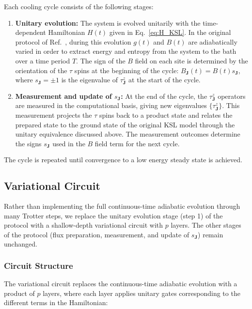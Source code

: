 \documentclass[twocolumn,
aps,
prx,
showpacs,
amsmath,
amssymb,
floatfix,
longbibliography,
superscriptaddress,
eprint]
{revtex4-1}
\begin{document}
Each cooling cycle consists of the following stages:

\begin{enumerate}

\item \textbf{Unitary evolution:} The system is evolved unitarily with the time-dependent Hamiltonian $H(t)$ given in Eq.~\eqref{eq:H_KSL}. In the original protocol of Ref.~\cite{Kishony_2025}, during this evolution $g(t)$ and $B(t)$ are adiabatically varied in order to extract energy and entropy from the system to the bath over a time period $T$. The sign of the $B$ field on each site is determined by the orientation of the $\tau$ spins at the beginning of the cycle: $B_{\mathbf{J}}(t) = B(t) s_{\mathbf{J}}$, where $s_{\mathbf{J}} = \pm 1$ is the eigenvalue of $\tau^z_{\mathbf{J}}$ at the start of the cycle.

\item \textbf{Measurement and update of $s_\mathbf{J}$:} At the end of the cycle, the $\tau^z_{\mathbf{J}}$ operators are measured in the computational basis, giving new eigenvalues $\{\tau^z_{\mathbf{J}}\}$. This measurement projects the $\tau$ spins back to a product state and relates the prepared state to the ground state of the original KSL model through the unitary equivalence discussed above. The measurement outcomes determine the signs $s_{\mathbf{J}}$ used in the $B$ field term for the next cycle.
\end{enumerate}

The cycle is repeated until convergence to a low energy steady state is achieved.

\subsection{Variational Circuit}

Rather than implementing the full continuous-time adiabatic evolution through many Trotter steps, we replace the unitary evolution stage (step 1) of the protocol with a shallow-depth variational circuit with $p$ layers. The other stages of the protocol (flux preparation, measurement, and update of $s_\mathbf{J}$) remain unchanged.

\subsubsection{Circuit Structure}

The variational circuit replaces the continuous-time adiabatic evolution with a product of $p$ layers, where each layer applies unitary gates corresponding to the different terms in the Hamiltonian:
\end{document}
